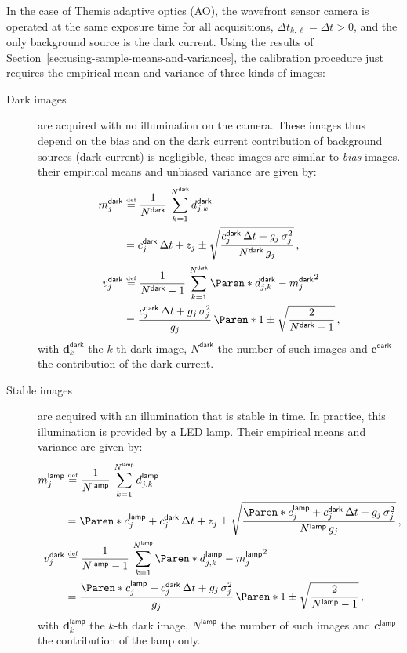 \documentclass[a4paper,11pt,twoside]{scrartcl}
\newcommand*{\Tag}[1]{\mathsf{#1}}
\newcommand*{\bydef}{\stackrel{{\scriptscriptstyle \text{def}}}{=}}
\newcommand*{\V}[1]{\boldsymbol{#1}}   %
\theoremstyle{plain} %
\theoremstyle{definition}
\theoremstyle{remark}
\begin{document}
In the case of Themis adaptive optics (AO), the wavefront sensor camera is
operated at the same exposure time for all acquisitions, $\Delta t_{k,\ell} =
\Delta t > 0$, and the only background source is the dark current.  Using the
results of Section~\ref{sec:using-sample-means-and-variances}, the calibration
procedure just requires the empirical mean and variance of three kinds of
images:
\begin{description}
\item[Dark images] are acquired with no illumination on the camera. These
images thus depend on the bias and on the dark current
contribution of background sources (dark current) is negligible, these images
are similar to \emph{bias} images. their empirical means and unbiased variance
are given by:
\begin{align}
  m^\Tag{dark}_j
  &\bydef \frac{1}{N^\Tag{dark}} \,
    \sum_{k=1}^{N^\Tag{dark}} d_{j,k}^\Tag{dark}
    \notag\\
  &= c^\Tag{dark}_j\,\Delta t + z_j
    \pm \sqrt{
      \frac{
        c^\Tag{dark}_j\,\Delta t + g_j\,\sigma_j^2
      }{
        N^\Tag{dark}\,g_j
      }
    } \,,
  \label{eq:Themis-dark-avg} \\
  v^\Tag{dark}_j
  &\bydef \frac{1}{N^\Tag{dark} - 1} \,
    \sum_{k=1}^{N^\Tag{dark}} \Paren*{d_{j,k}^\Tag{dark} - m^\Tag{dark}_j}^2
    \notag\\
  &= %
    \frac{c^\Tag{dark}_j\,\Delta t + g_j\,\sigma_j^2}{g_j}\,
    \Paren*{1 \pm \sqrt{\frac{2}{N^\Tag{dark} - 1}}} \,,
    \label{eq:Themis-dark-var}
\end{align}
with $\V d^\Tag{dark}_k$ the $k$-th dark image, $N^\Tag{dark}$ the number of
such images and $\V c^\Tag{dark}$ the contribution of the dark current.

\item[Stable images] are acquired with an illumination that is stable in time.
In practice, this illumination is provided by a LED lamp. Their empirical means
and variance are given by:
\begin{align}
  m^\Tag{lamp}_j
  &\bydef \frac{1}{N^\Tag{lamp}} \,
    \sum_{k=1}^{N^\Tag{lamp}} d_{j,k}^\Tag{lamp}
    \notag\\
  &= \Paren*{c^\Tag{lamp}_j + c^\Tag{dark}_j}\,\Delta t + z_j
    \pm \sqrt{
      \frac{
        \Paren*{c^\Tag{lamp}_j + c^\Tag{dark}_j}\,\Delta t + g_j\,\sigma_j^2
      }{
        N^\Tag{lamp}\,g_j
      }
    } \,,
    \label{eq:Themis-lamp-avg} \\
  v^\Tag{dark}_j
  &\bydef \frac{1}{N^\Tag{lamp} - 1} \,
    \sum_{k=1}^{N^\Tag{lamp}} \Paren*{d_{j,k}^\Tag{lamp} - m^\Tag{lamp}_j}^2
    \notag\\
  &= %
    \frac{
      \Paren*{c^\Tag{lamp}_j + c^\Tag{dark}_j}\,\Delta t + g_j\,\sigma_j^2
    }{
      g_j
    }\,
    \Paren*{1 \pm \sqrt{\frac{2}{N^\Tag{lamp} - 1}}} \,,
    \label{eq:Themis-lamp-var-approx}
\end{align}
with $\V d^\Tag{lamp}_k$ the $k$-th dark image, $N^\Tag{lamp}$ the number of
such images and $\V c^\Tag{lamp}$ the contribution of the lamp only.


\end{description}
\end{document}
